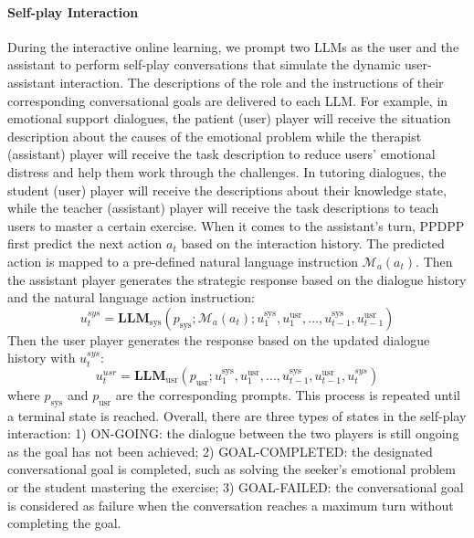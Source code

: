 \documentclass{article} %
\begin{document}
\paragraph{Self-play Interaction}
During the interactive online learning, we prompt two LLMs as the user and the assistant to perform self-play conversations that simulate the dynamic user-assistant interaction. The descriptions of the role and the instructions of their corresponding conversational goals are delivered to each LLM. 
For example, in emotional support dialogues, the patient (user) player will receive the situation description about the causes of the emotional problem while the therapist (assistant) player will receive the task description to reduce users' emotional distress and help them work through the challenges. 
In tutoring dialogues, the student (user) player will receive the descriptions about their knowledge state, while the teacher (assistant) player will receive the task descriptions to teach users to master a certain exercise. 
When it comes to the assistant's turn, PPDPP first predict the next action $a_t$ based on the interaction history. The predicted action is mapped to a pre-defined natural language instruction $\mathcal{M}_a(a_t)$. Then the assistant player generates the strategic response based on the dialogue history and the natural language action instruction:
\begin{equation}
    u_t^{sys} = \mathbf{LLM}_\text{sys}(p_\text{sys};\mathcal{M}_a(a_t);u_1^\text{sys}, u_1^\text{usr}, ..., u_{t-1}^\text{sys}, u_{t-1}^\text{usr})
\end{equation}
Then the user player generates the response based on the updated dialogue history with $u_t^{sys}$: 
\begin{equation}
    u_t^{usr} = \mathbf{LLM}_\text{usr}(p_\text{usr};u_1^\text{sys}, u_1^\text{usr}, ..., u_{t-1}^\text{sys}, u_{t-1}^\text{usr},u_t^{sys})
\end{equation}
where $p_\text{sys}$ and $p_\text{usr}$ are the corresponding prompts. This process is repeated until a terminal state is reached. 
Overall, there are three types of states in the self-play interaction: 1) ON-GOING: the dialogue between the two players is still ongoing as the goal has not been achieved; 2) GOAL-COMPLETED: the designated conversational goal is completed, such as solving the seeker's emotional problem or the student mastering the exercise; 3) GOAL-FAILED: the conversational goal is considered as failure when the conversation reaches a maximum turn without completing the goal.  
\end{document}
